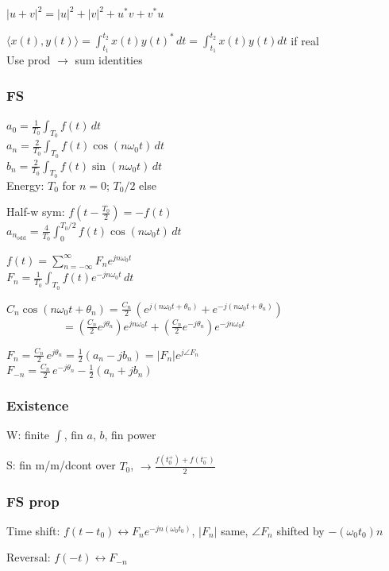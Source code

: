 \documentclass[4pt]{article}
\theoremstyle{definition}
\theoremstyle{definition}
\renewcommand{\o}{\omega}
\newcommand{\ra}{\rightarrow}
\newcommand{\lra}{\leftrightarrow}
\begin{document}
\begin{landscape}
\begin{multicols}{3}
    $|u+v|^2 = |u|^2 + |v|^2 + u^*v + v^*u$

    $\langle x(t), y(t)\rangle = \int_{t_1}^{t_2} x(t) y(t)^* \, dt = \int_{t_1}^{t_2} x(t) y(t) dt$ if real\\
    Use prod $\ra$ sum identities
\newpage
\subsubsection*{FS}
    $a_0 = \frac{1}{T_0} \int_{T_0} f(t)\, dt$\\
    $a_n = \frac{2}{T_0} \int_{T_0} f(t) \cos(n\o_0t)\,dt$\\
    $b_n = \frac{2}{T_0} \int_{T_0} f(t) \sin(n\o_0t)\,dt$\\
    Energy: $T_0$ for $n=0$; $T_0/2$ else
     
    Half-w sym: $f(t - \frac{T_0}{2}) = -f(t)$\\
    $a_{n_\mathrm{odd}} = \frac{4}{T_0}\int_{0}^{T_0/2} f(t) \cos (n\o_0 t) \, dt$

    $f(t) = \sum_{n=-\infty}^{\infty} F_n e^{jn\o_0 t}$\\
    $F_n = \frac{1}{T_0}\int_{T_0} f(t) e^{-jn\o_0t}\,dt$

    $C_n\cos(n\o_0 t + \theta_n) = \frac{C_n}{2} \, (e^{j(n\o_0t + \theta_n)} + e^{-j(n\o_0 t + \theta_n)})$\\
    $ \hspace{5em}= (\frac{C_n} 2 e^{j\theta_n}) e^{jn\o_0 t} + (\frac{C_n} 2 e^{-j\theta_n}) e^{-jn\o_0 t}$

    $F_n = \frac{C_n}{2}\, e^{j\theta_n} = \frac 1 2 (a_n - jb_n) = |F_n| e^{j\angle F_n}$\\
    $F_{-n} = \frac{C_n}{2}\, e^{-j\theta_n} - \frac 1 2 (a_n + jb_n)$  %
\subsubsection*{Existence}
    W: finite $\int$, fin $a$, $b$, fin power

    S: fin m/m/dcont over $T_0$, $\ra \frac{f(t_0^+) + f(t_0^-)}{2}$
\subsubsection*{FS prop}
    Time shift: $f(t-t_0)\lra F_n e^{-jn(\o_0 t_0)}$, $|F_n|$ same, $\angle F_n$ shifted by $-(\o_0 t_0)n$

    Reversal: $f(-t)\lra F_{-n}$


\end{multicols}
\end{landscape}
\end{document}

